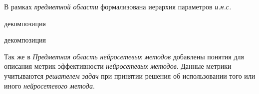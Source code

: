 В рамках \textit{предметной области} формализована иерархия параметров \textit{и.н.с.}
\begin{SCn}
	\begin{scnindent}
		\begin{scneqtoset}
			\begin{scnrelfromset}{декомпозиция}
			\end{scnrelfromset}
			\begin{scnrelfromset}{декомпозиция}
			\end{scnrelfromset}
		\end{scneqtoset}
	\end{scnindent}
\end{SCn}

Так же в \textit{Предметная область нейросетевых методов} добавлены понятия для описания метрик эффективности \textit{нейросетевых методов}. Данные метрики учитываются \textit{решателем задач} при принятии решения об использовании того или иного \textit{нейросетевого метода}.

